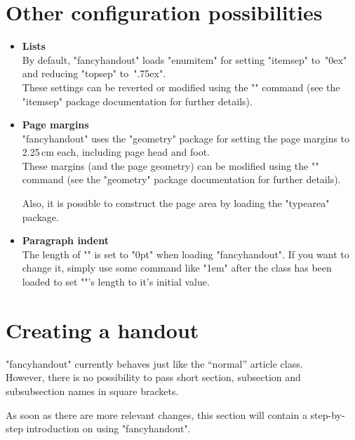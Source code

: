 \documentclass[11pt]{ltxdoc}
\begin{document}
	\section{Other configuration possibilities}
	\begin{itemize}
		\item \textbf{Lists} \\
			By default, "fancyhandout" loads "enumitem" for setting "itemsep" to~"0ex" and reducing "topsep" to~".75ex". \\
			These settings can be reverted or modified using the "\setlist" command (see the "itemsep" package documentation for further details).
	
		\item \textbf{Page margins} \\
			"fancyhandout" uses the "geometry" package for setting the page margins to 2.25\,cm each, including page head and foot. \\
			These margins (and the page geometry) can be modified using the "\geometry" command (see the "geometry" package documentation for further details).
			
			\smallskip
			Also, it is possible to construct the page area by loading the "typearea" package.
		
		\item \textbf{Paragraph indent} \\
			The length of "\parindent" is set to "0pt" when loading "fancyhandout". If you want to change it, simply use some command like "\parindent 1em" after the class has been loaded to set "\parindent"'s length to it's initial value.
	\end{itemize}
	
	
	\section{Creating a handout}
	"fancyhandout" currently behaves just like the \enquote{normal} article class. \\
	However, there is no possibility to pass short section, subsection and subsubsection names in square brackets.
	
	\bigskip
	As soon as there are more relevant changes, this section will contain a step-by-step introduction on using "fancyhandout".
	
	
	\clearpage
\end{document}
